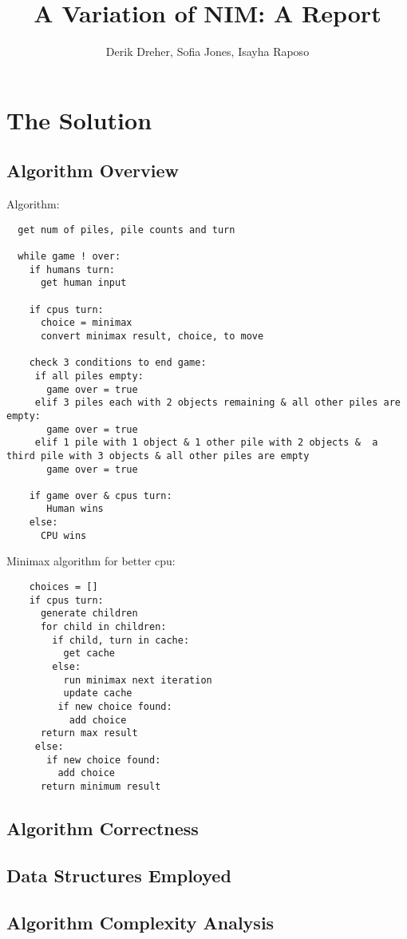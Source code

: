 \documentclass{article}
\begin{document}
\begin{titlepage}
\title{A Variation of NIM: A Report}
\author{Derik Dreher, Sofia Jones, Isayha Raposo}
\maketitle
\thispagestyle{empty}
\end{titlepage}

\rhead{\today}

\section*{The Solution}
\subsection*{Algorithm Overview}

Algorithm:
\begin{verbatim}
  get num of piles, pile counts and turn
  
  while game ! over:
    if humans turn:
      get human input
      
    if cpus turn: 
      choice = minimax
      convert minimax result, choice, to move 
      
    check 3 conditions to end game:
     if all piles empty:
       game over = true
     elif 3 piles each with 2 objects remaining & all other piles are empty:
       game over = true
     elif 1 pile with 1 object & 1 other pile with 2 objects &  a third pile with 3 objects & all other piles are empty
       game over = true
       
    if game over & cpus turn:
       Human wins
    else:
      CPU wins
\end{verbatim}

Minimax algorithm for better cpu:
\begin{verbatim}
    choices = []
    if cpus turn: 
      generate children
      for child in children:
        if child, turn in cache:
          get cache
        else: 
          run minimax next iteration
          update cache
         if new choice found:
           add choice
      return max result
     else:
       if new choice found:
         add choice
      return minimum result
\end{verbatim}


\subsection*{Algorithm Correctness}
\subsection*{Data Structures Employed}
\subsection*{Algorithm Complexity Analysis}
\end{document}
